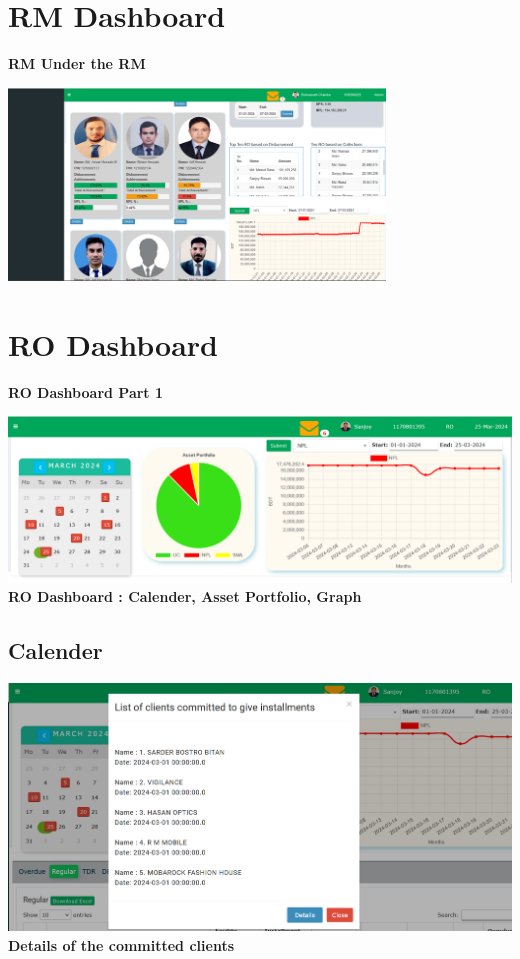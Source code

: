 \documentclass{article}
\begin{document}
\section{RM Dashboard}
\textbf{RM Under the RM}
\begin{center}
\includegraphics[width=0.75\textwidth]{image/rm_1_team_view.png}
\end{center}



\section{RO Dashboard}
\textbf{RO Dashboard Part 1}
\begin{center}
\includegraphics[width=1.0\textwidth]{image/ro_1.png}
\textbf {RO Dashboard : Calender, Asset Portfolio, Graph}
\end{center}


\subsection{Calender}

\begin{center}
\includegraphics[width=.75\textwidth]{image/ro_3_commited_clients_popup.png}\\
\textbf {Details of the committed clients}
\end{center}
\end{document}
